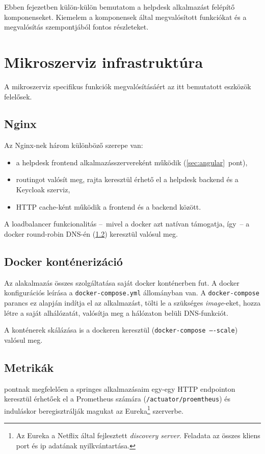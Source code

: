 Ebben  fejezetben külön-külön bemutatom a helpdesk alkalmazást felépítő komponenseket. Kiemelem a komponensek által megvalósított funkciókat és a megvalósítás szempontjából fontos részleteket. 


\section{Mikroszerviz infrastruktúra}
A mikroszerviz specifikus funkciók megvalósításáért az itt bemutatott eszközök felelősek.

\subsection{Nginx}\label{sec:nginx}
Az Nginx-nek három különböző szerepe van:

\begin{itemize}
	\item a \foreignlanguage{british}{helpdesk frontend} alkalmazásszervereként működik (\ref{sec:angular}~pont),
	
	\item \foreignlanguage{british}{routing}ot valósít meg, rajta keresztül érhető el a \foreignlanguage{british}{helpdesk backend} és a \foreignlanguage{british}{Keycloak} szerviz,
	
	\item \foreignlanguage{british}{HTTP cache}-ként működik a frontend és a backend között.
\end{itemize}

A loadbalancer funkcionalitás --~mivel a docker azt natívan támogatja, így~-- a \foreignlanguage{british}{docker round-robin DNS}-én (\ref{sec:docker}) keresztül valósul meg.


\subsection{Docker konténerizáció}\label{sec:docker}
Az alakalmazás összes szolgáltatása saját docker konténerben fut. A docker konfigurációs leírása a \texttt{docker-compose.yml} állományban van. A \texttt{docker-compose} parancs ez alapján indítja el az alkalmazást, tölti le a szükséges \emph{image}-eket, hozza létre a saját alhálózatát, valósítja meg a hálózaton belüli DNS-funkciót.

A konténerek skálázása is a dockeren keresztül (\texttt{docker-compose ----scale}) valósul meg.


\subsection{Metrikák}\label{sec:metrikak}
 pontnak megfelelően a springes alkalmazásaim egy-egy HTTP endpointon keresztül érhetőek el a Prometheus számára (\texttt{\mbox{/actuator/proemtheus}}) és induláskor beregisztrálják magukat az Eureka\footnote{Az Eureka a Netflix által fejlesztett \emph{discovery server}. Feladata az összes kliens port és ip adatának nyilkvántartása.} szerverbe.

